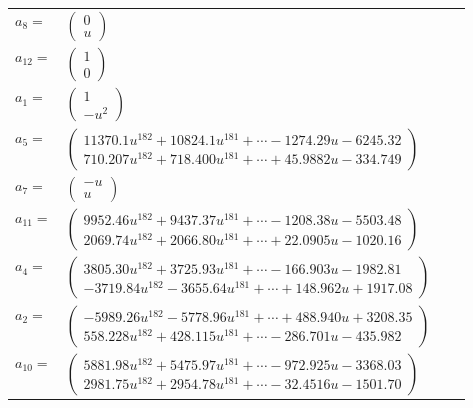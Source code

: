 \documentclass[1p]{elsarticle_modified}
\theoremstyle{definition}
\begin{document}
\begin{tabular}{m{7pt} m{180pt} m{7pt} m{180pt} }
\flushright $a_{8}=$&$\begin{pmatrix}0\\u\end{pmatrix}$ \\
\flushright $a_{12}=$&$\begin{pmatrix}1\\0\end{pmatrix}$ \\
\flushright $a_{1}=$&$\begin{pmatrix}1\\- u^2\end{pmatrix}$ \\
\flushright $a_{5}=$&$\begin{pmatrix}11370.1 u^{182}+10824.1 u^{181}+\cdots-1274.29 u-6245.32\\710.207 u^{182}+718.400 u^{181}+\cdots+45.9882 u-334.749\end{pmatrix}$ \\
\flushright $a_{7}=$&$\begin{pmatrix}- u\\u\end{pmatrix}$ \\
\flushright $a_{11}=$&$\begin{pmatrix}9952.46 u^{182}+9437.37 u^{181}+\cdots-1208.38 u-5503.48\\2069.74 u^{182}+2066.80 u^{181}+\cdots+22.0905 u-1020.16\end{pmatrix}$ \\
\flushright $a_{4}=$&$\begin{pmatrix}3805.30 u^{182}+3725.93 u^{181}+\cdots-166.903 u-1982.81\\-3719.84 u^{182}-3655.64 u^{181}+\cdots+148.962 u+1917.08\end{pmatrix}$ \\
\flushright $a_{2}=$&$\begin{pmatrix}-5989.26 u^{182}-5778.96 u^{181}+\cdots+488.940 u+3208.35\\558.228 u^{182}+428.115 u^{181}+\cdots-286.701 u-435.982\end{pmatrix}$ \\
\flushright $a_{10}=$&$\begin{pmatrix}5881.98 u^{182}+5475.97 u^{181}+\cdots-972.925 u-3368.03\\2981.75 u^{182}+2954.78 u^{181}+\cdots-32.4516 u-1501.70\end{pmatrix}$ \\

\end{tabular}
\end{document}
